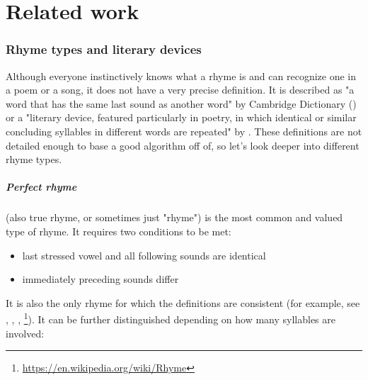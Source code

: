 \chapter{Related work}


\subsection{Rhyme types and literary devices}
Although everyone instinctively knows what a rhyme is and can recognize one in a poem or a song, it does not have a very precise definition. It is described as "a word that has the same last sound as another word" by Cambridge Dictionary (\cite{walter2008cambridge}) or a "literary device, featured particularly in poetry, in which identical or similar concluding syllables in different words are repeated" by \cite{literarydevices2020}. These definitions are not detailed enough to base a good algorithm off of, so let's look deeper into different rhyme types.

\paragraph{Perfect rhyme} (also true rhyme, or sometimes just "rhyme") is the most common and valued  type of rhyme. It requires two conditions to be met:

\begin{itemize}
	\item last stressed vowel and all following sounds are identical
	\item immediately preceding sounds differ
\end{itemize}

It is also the only rhyme for which the definitions are consistent (for example, see \cite{bain1867manual}, \cite{vanphonological}, \cite{bergman2017litcharts}, \footnote{\url{https://en.wikipedia.org/wiki/Rhyme}}). It can be further distinguished depending on how many syllables are involved:

